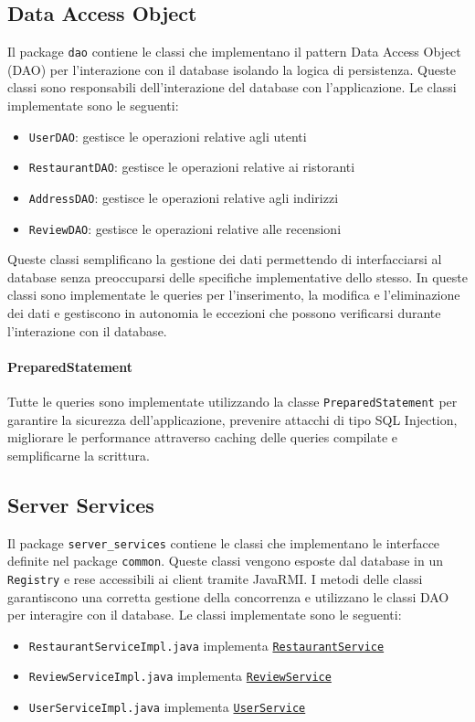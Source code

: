 \subsection{Data Access Object}
Il package \texttt{dao} contiene le classi che implementano 
il pattern Data Access Object (DAO) per l'interazione
con il database isolando la logica di persistenza.
Queste classi sono responsabili dell'interazione 
del database con l'applicazione.
Le classi implementate sono le seguenti:
\begin{itemize}
    \item \texttt{UserDAO}: gestisce le operazioni relative agli utenti
    \item \texttt{RestaurantDAO}: gestisce le operazioni relative ai ristoranti
    \item \texttt{AddressDAO}: gestisce le operazioni relative agli indirizzi
    \item \texttt{ReviewDAO}: gestisce le operazioni relative alle recensioni
\end{itemize}
Queste classi semplificano la gestione dei dati permettendo 
di interfacciarsi al database senza preoccuparsi delle specifiche
implementative dello stesso. 
In queste classi sono implementate le queries per l'inserimento, 
la modifica e l'eliminazione dei dati e gestiscono in autonomia 
le eccezioni che possono verificarsi durante l'interazione
con il database.
\paragraph{PreparedStatement}
Tutte le queries sono implementate utilizzando la classe
\texttt{PreparedStatement} per garantire la sicurezza
dell'applicazione, prevenire attacchi di tipo SQL Injection, 
migliorare le performance attraverso caching delle queries compilate
e semplificarne la scrittura.

\subsection{Server Services}
Il package \texttt{server\_services} contiene le classi che implementano
le interfacce definite nel package \texttt{common}.
Queste classi vengono esposte dal database in un \texttt{Registry}
e rese accessibili ai client tramite JavaRMI.
I metodi delle classi garantiscono una corretta gestione della 
concorrenza e utilizzano le classi DAO per interagire con il database.
Le classi implementate sono le seguenti:
\begin{itemize}
    \item \texttt{RestaurantServiceImpl.java} implementa \texttt{\hyperref[sec:restaurantservice]{RestaurantService}}
    \item \texttt{ReviewServiceImpl.java} implementa \texttt{\hyperref[sec:reviewservice]{ReviewService}}
    \item \texttt{UserServiceImpl.java} implementa \texttt{\hyperref[sec:userservice]{UserService}}
\end{itemize}
